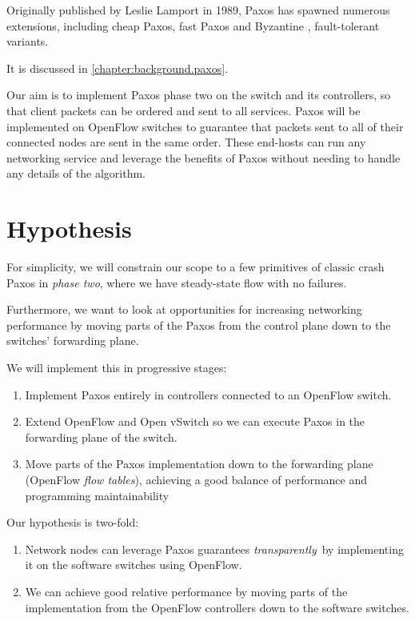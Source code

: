 Originally published by Leslie Lamport in 1989, Paxos
has spawned numerous extensions, including cheap Paxos,
 fast Paxos
 and Byzantine
, fault-tolerant variants.

It is discussed in \vref{chapter:background.paxos}.

Our aim is to implement Paxos phase two on the switch and its controllers,
so that client packets can be ordered and sent to all services.
%
Paxos will be implemented on OpenFlow switches to guarantee that
packets sent to all of their connected nodes are sent in the same order.
These end-hosts can run any networking service and leverage the benefits of
Paxos without needing to handle any details of the algorithm.

\section{Hypothesis}

For simplicity, we will constrain our scope to a few primitives of
classic crash Paxos in \textit{phase two},
where we have steady-state
flow with no failures.

Furthermore, we want to look at opportunities for increasing networking
performance by moving parts of the Paxos from the control
plane down to the switches' forwarding
plane.

We will implement this in progressive stages:

\begin{enumerate}
  \item Implement Paxos entirely in controllers connected to an OpenFlow
  switch.

  \item Extend OpenFlow and Open vSwitch so we can execute Paxos in the
  forwarding plane of the switch.

  \item Move parts of the Paxos implementation down to the forwarding plane
  (OpenFlow \textit{flow tables}), achieving a good balance of performance and
  programming maintainability
\end{enumerate}

Our hypothesis is two-fold:

\begin{enumerate}
\item Network nodes can leverage Paxos guarantees \textit{transparently} by
implementing it on the software switches using OpenFlow.
\item We can achieve good relative performance by moving parts of the
implementation from the OpenFlow controllers down to the software switches.
\end{enumerate}

